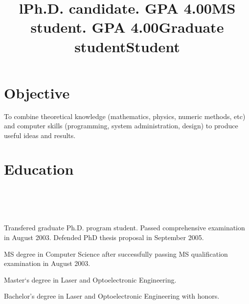 \documentclass[10pt,overlapped,line]{res}
\begin{document}
\begin{resume}

\section{Objective}
To combine theoretical knowledge (mathematics, physics, numeric
methods, etc) and computer skills (programming, system administration,
design) to produce useful ideas and results.

\section{Education}
\begin{format}
  \title{l}\\
  \\
  \body\\
\end{format}

\title{Ph.D. candidate. GPA 4.00}
\begin{position}
  Transfered graduate Ph.D. program student. Passed comprehensive
  examination in August 2003. Defended PhD thesis proposal in
  September 2005.
\end{position}

 \title{MS student. GPA 4.00}
 \begin{position}
  MS degree in Computer Science after successfully passing MS
 qualification examination in August 2003.
 \end{position}

 \title{Graduate student}
 \begin{position}
  Master`s degree in Laser and Optoelectronic Engineering.
 \end{position}

 \title{Student}
 \begin{position}
  Bachelor's degree in Laser and Optoelectronic Engineering with
  honors.
 \end{position}


\end{resume}
\end{document}
